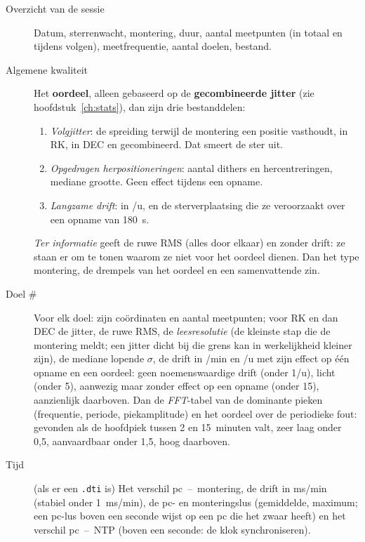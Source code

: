 \begin{description}
  \item[Overzicht van de sessie] Datum, sterrenwacht, montering, duur, aantal
  meetpunten (in totaal en tijdens volgen), meetfrequentie, aantal doelen,
  bestand.

  \item[Algemene kwaliteit] Het \textbf{oordeel}, alleen gebaseerd op de
  \textbf{gecombineerde jitter} (zie hoofdstuk~\ref{ch:stats}), dan zijn drie
  bestanddelen:
  \begin{enumerate}
    \item \emph{Volgjitter}: de spreiding terwijl de montering een positie
    vasthoudt, in RK, in DEC en gecombineerd. Dat smeert de ster uit.
    \item \emph{Opgedragen herpositioneringen}: aantal dithers en
    hercentreringen, mediane grootte. Geen effect tijdens een opname.
    \item \emph{Langzame drift}: in \arcsec/u, en de sterverplaatsing die ze
    veroorzaakt over een opname van 180~s.
  \end{enumerate}
  \emph{Ter informatie} geeft de ruwe RMS (alles door elkaar) en zonder drift:
  ze staan er om te tonen waarom ze niet voor het oordeel dienen. Dan het type
  montering, de drempels van het oordeel en een samenvattende zin.

  \item[Doel \#] Voor elk doel: zijn coördinaten en aantal meetpunten; voor RK
  en dan DEC de jitter, de ruwe RMS, de \emph{leesresolutie} (de kleinste stap
  die de montering meldt; een jitter dicht bij die grens kan in werkelijkheid
  kleiner zijn), de mediane lopende $\sigma$, de drift in \arcsec/min en
  \arcsec/u met zijn effect op één opname en een oordeel: geen noemenswaardige
  drift (onder 1\arcsec/u), licht (onder 5), aanwezig maar zonder effect op een
  opname (onder 15), aanzienlijk daarboven. Dan de \emph{FFT}-tabel van de
  dominante pieken (frequentie, periode, piekamplitude) en het oordeel over de
  periodieke fout: gevonden als de hoofdpiek tussen 2 en 15~minuten valt, zeer
  laag onder 0,5\arcsec, aanvaardbaar onder 1,5\arcsec, hoog daarboven.

  \item[Tijd] (als er een \texttt{.dti} is) Het verschil pc~--~montering, de
  drift in ms/min (stabiel onder 1~ms/min), de pc- en monteringslus
  (gemiddelde, maximum; een pc-lus boven een seconde wijst op een pc die het
  zwaar heeft) en het verschil pc~--~NTP (boven een seconde: de klok
  synchroniseren).


\end{description}
